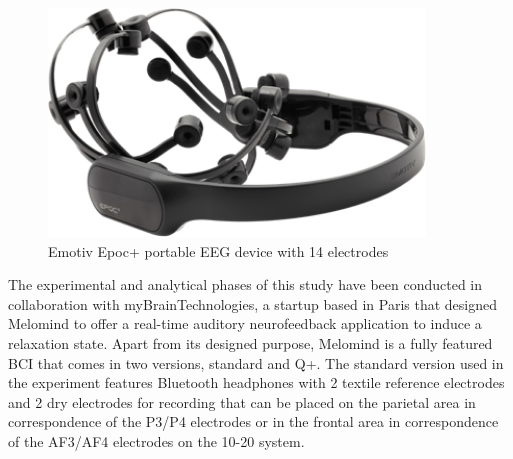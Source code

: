 \begin{figure}[h]
\includegraphics[width=10cm]{img/background/fig_emotiv.png}
\centering
\caption{Emotiv Epoc+ portable EEG device with 14 electrodes}\label{fig_emotiv}
\end{figure}
The experimental and analytical phases of this study have been conducted in collaboration with myBrainTechnologies, a startup based in Paris that designed Melomind to offer a real-time auditory neurofeedback application to induce a relaxation state. Apart from its designed purpose, Melomind is a fully featured \ac{BCI} that comes in two versions, standard and Q+. The standard version used in the experiment features Bluetooth headphones with 2 textile reference electrodes and 2 dry electrodes for recording that can be placed on the parietal area in correspondence of the P3/P4 electrodes or in the frontal area in correspondence of the AF3/AF4 electrodes on the 10-20 system. 
